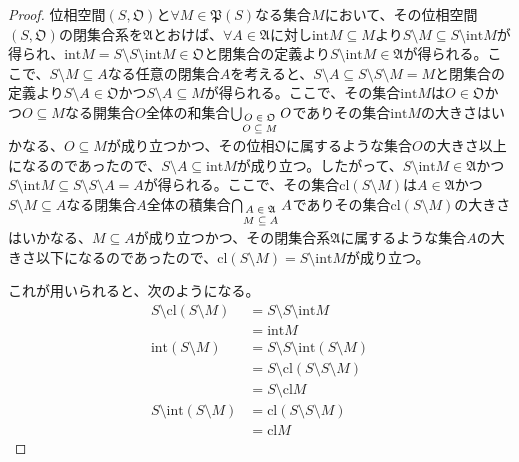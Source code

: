 \documentclass[dvipdfmx]{jsarticle}
\begin{document}
\begin{proof}
位相空間$\left( S,\mathfrak{O} \right)$と$\forall M \in \mathfrak{P}(S)$なる集合$M$において、その位相空間$\left( S,\mathfrak{O} \right)$の閉集合系を$\mathfrak{A}$とおけば、$\forall A \in \mathfrak{A}$に対し${\mathrm{int}}M \subseteq M$より$S \setminus M \subseteq S \setminus {\mathrm{int}}M$が得られ、${\mathrm{int}}M = S \setminus S \setminus {\mathrm{int}}M\in \mathfrak{O}$と閉集合の定義より$S \setminus {\mathrm{int}}M\in \mathfrak{A}$が得られる。ここで、$S \setminus M \subseteq A$なる任意の閉集合$A$を考えると、$S \setminus A \subseteq S \setminus S \setminus M = M$と閉集合の定義より$S \setminus A \in \mathfrak{O}$かつ$S \setminus A \subseteq M$が得られる。ここで、その集合${\mathrm{int}}M$は$O \in \mathfrak{O}$かつ$O \subseteq M$なる開集合$O$全体の和集合$\bigcup_{\scriptsize \begin{matrix}
O \in \mathfrak{O} \\
O \subseteq M \\
\end{matrix}} O$でありその集合${\mathrm{int}}M$の大きさはいかなる、$O \subseteq M$が成り立つかつ、その位相$\mathfrak{O}$に属するような集合$O$の大きさ以上になるのであったので、$S \setminus A \subseteq {\mathrm{int}}M$が成り立つ。したがって、$S \setminus {\mathrm{int}}M\in \mathfrak{A}$かつ$S \setminus {\mathrm{int}}M \subseteq S \setminus S \setminus A = A$が得られる。ここで、その集合${\mathrm{cl}}(S \setminus M)$は$A \in \mathfrak{A}$かつ$S \setminus M \subseteq A$なる閉集合$A$全体の積集合$\bigcap_{\scriptsize \begin{matrix}
A \in \mathfrak{A} \\
M \subseteq A \\
\end{matrix}} A$でありその集合${\mathrm{cl}}(S \setminus M)$の大きさはいかなる、$M \subseteq A$が成り立つかつ、その閉集合系$\mathfrak{A}$に属するような集合$A$の大きさ以下になるのであったので、${\mathrm{cl}}(S \setminus M) = S \setminus {\mathrm{int}}M$が成り立つ。\par
これが用いられると、次のようになる。
\begin{align*}
S \setminus {\mathrm{cl}}(S \setminus M) &= S \setminus S \setminus {\mathrm{int}}M\\
&= {\mathrm{int}}M\\
{\mathrm{int}}(S \setminus M) &= S \setminus S \setminus {\mathrm{int}}(S \setminus M)\\
&= S \setminus {\mathrm{cl}}(S \setminus S \setminus M)\\
&= S \setminus {\mathrm{cl}}M\\
S \setminus {\mathrm{int}}(S \setminus M) &= {\mathrm{cl}}(S \setminus S \setminus M)\\
&= {\mathrm{cl}}M
\end{align*}
\end{proof}
\end{document}
